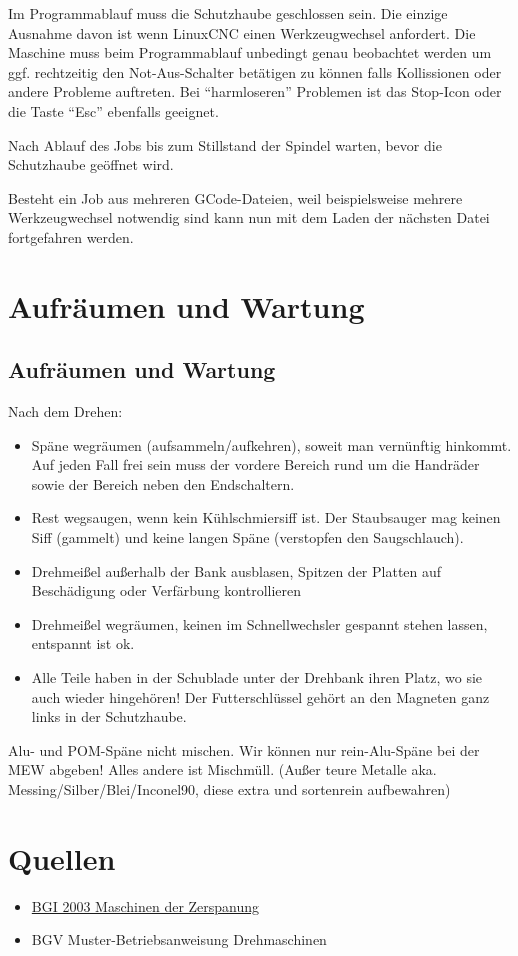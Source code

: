 \documentclass{\basedir/fablab-document}
\begin{document}
Im Programmablauf muss die Schutzhaube geschlossen sein. Die einzige Ausnahme davon ist wenn LinuxCNC einen Werkzeugwechsel anfordert. Die Maschine muss beim Programmablauf unbedingt genau beobachtet werden um ggf. rechtzeitig den Not-Aus-Schalter betätigen zu können falls Kollissionen oder andere Probleme auftreten. Bei \enquote{harmloseren} Problemen ist das Stop-Icon oder die Taste \enquote{Esc} ebenfalls geeignet.

Nach Ablauf des Jobs bis zum Stillstand der Spindel warten, bevor die Schutzhaube geöffnet wird.

Besteht ein Job aus mehreren GCode-Dateien, weil beispielsweise mehrere Werkzeugwechsel notwendig sind kann nun mit dem Laden der nächsten Datei fortgefahren werden.

\newpage
\section{Aufräumen und Wartung}


\subsection{Aufräumen und Wartung}
Nach dem Drehen:

\begin{itemize}
 \item Späne wegräumen (aufsammeln/aufkehren), soweit man vernünftig hinkommt. Auf jeden Fall frei sein muss der vordere Bereich rund um die Handräder sowie der Bereich neben den Endschaltern.
 \item Rest wegsaugen, wenn kein Kühlschmiersiff ist. Der Staubsauger mag keinen Siff (gammelt) und keine langen Späne (verstopfen den Saugschlauch).
 \item Drehmeißel außerhalb der Bank ausblasen, Spitzen der Platten auf Beschädigung oder Verfärbung kontrollieren
 \item Drehmeißel wegräumen, keinen im Schnellwechsler gespannt stehen lassen, entspannt ist ok.
 \item Alle Teile haben in der Schublade unter der Drehbank ihren Platz, wo sie auch wieder hingehören! Der Futterschlüssel gehört an den Magneten ganz links in der Schutzhaube.
\end{itemize}


Alu- und POM-Späne nicht mischen. Wir können nur rein-Alu-Späne bei der MEW abgeben! Alles andere ist Mischmüll. (Außer teure Metalle aka. Messing/Silber/Blei/Inconel90, diese extra und sortenrein aufbewahren)

\appendix

\section{Quellen}
\begin{itemize}
 \item \href{http://www.arbeitssicherheit.de/media/pdfs/CCC_1290.pdf}{BGI 2003 Maschinen der Zerspanung}
 \item BGV Muster-Betriebsanweisung Drehmaschinen
\end{itemize}

\end{document}
